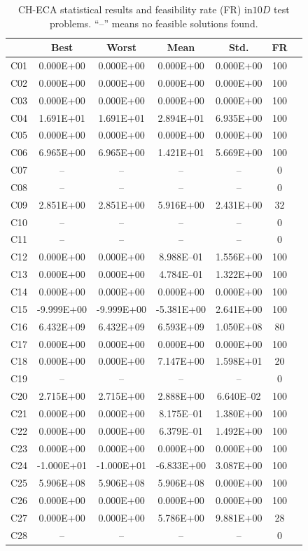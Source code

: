 \documentclass[conference]{IEEEtran}
\begin{document}
\begin{table}[!]
	\caption{CH-ECA statistical results and feasibility rate (FR) in$10D$ test problems. ``--'' means no feasible solutions found.}
	\centering
	\begin{tabular}{|c|c|c|c|c|c|c|}
	\hline
     & Best & Worst & Mean & Std. & FR \\ \hline \hline
C01 & 0.000E+00 & 0.000E+00 & 0.000E+00 & 0.000E+00 &  100 \\ 
C02 & 0.000E+00 & 0.000E+00 & 0.000E+00 & 0.000E+00 &  100 \\ 
C03 & 0.000E+00 & 0.000E+00 & 0.000E+00 & 0.000E+00 &  100 \\ 
C04 & 1.691E+01 & 1.691E+01 & 2.894E+01 & 6.935E+00 &  100 \\ 
C05 & 0.000E+00 & 0.000E+00 & 0.000E+00 & 0.000E+00 &  100 \\ 
C06 & 6.965E+00 & 6.965E+00 & 1.421E+01 & 5.669E+00 &  100 \\ 
C07 &  -- &  -- &  -- &  -- &    0 \\ 
C08 &  -- &  -- &  -- &  -- &    0 \\ 
C09 & 2.851E+00 & 2.851E+00 & 5.916E+00 & 2.431E+00 &   32 \\ 
C10 &  -- &  -- &  -- &  -- &    0 \\ 
C11 &  -- &  -- &  -- &  -- &    0 \\ 
C12 & 0.000E+00 & 0.000E+00 & 8.988E--01 & 1.556E+00 &  100 \\ 
C13 & 0.000E+00 & 0.000E+00 & 4.784E--01 & 1.322E+00 &  100 \\ 
C14 & 0.000E+00 & 0.000E+00 & 0.000E+00 & 0.000E+00 &  100 \\ 
C15 & -9.999E+00 & -9.999E+00 & -5.381E+00 & 2.641E+00 &  100 \\ 
C16 & 6.432E+09 & 6.432E+09 & 6.593E+09 & 1.050E+08 &   80 \\ 
C17 & 0.000E+00 & 0.000E+00 & 0.000E+00 & 0.000E+00 &  100 \\ 
C18 & 0.000E+00 & 0.000E+00 & 7.147E+00 & 1.598E+01 &   20 \\ 
C19 &  -- &  -- &  -- &  -- &    0 \\ 
C20 & 2.715E+00 & 2.715E+00 & 2.888E+00 & 6.640E--02 &  100 \\ 
C21 & 0.000E+00 & 0.000E+00 & 8.175E--01 & 1.380E+00 &  100 \\ 
C22 & 0.000E+00 & 0.000E+00 & 6.379E--01 & 1.492E+00 &  100 \\ 
C23 & 0.000E+00 & 0.000E+00 & 0.000E+00 & 0.000E+00 &  100 \\ 
C24 & -1.000E+01 & -1.000E+01 & -6.833E+00 & 3.087E+00 &  100 \\ 
C25 & 5.906E+08 & 5.906E+08 & 5.906E+08 & 0.000E+00 &  100 \\ 
C26 & 0.000E+00 & 0.000E+00 & 0.000E+00 & 0.000E+00 &  100 \\ 
C27 & 0.000E+00 & 0.000E+00 & 5.786E+00 & 9.881E+00 &   28 \\ 
C28 &  -- &  -- &  -- &  -- &    0 \\ 
\hline
	\end{tabular}
	\label{tab:d10}
\end{table}
\end{document}
